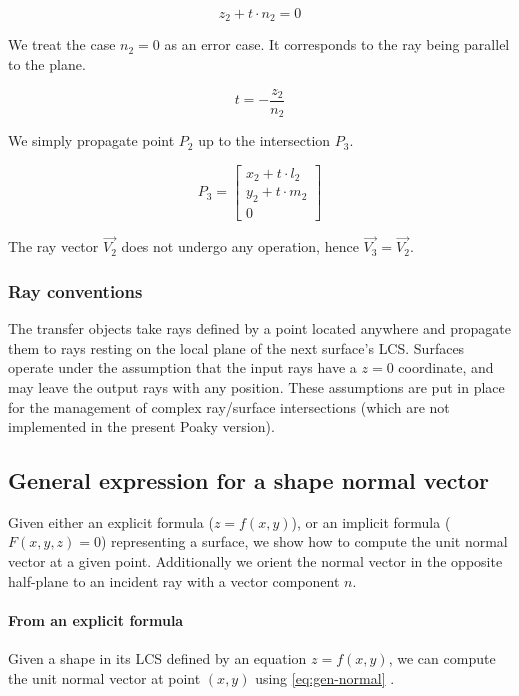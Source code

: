 \begin{equation}
z_2 + t \cdot n_2 = 0
\end{equation}

We treat the case $n_2 = 0$ as an error case. It corresponds to the ray
being parallel to the plane.

\begin{equation}
t = - \frac{z_2}{n_2}
\end{equation}

We simply propagate point $P_2$ up to the intersection $P_3$.

\begin{equation}
P_3 = \begin{bmatrix}
x_2 + t \cdot l_2 \\
y_2 + t \cdot m_2 \\
0
\end{bmatrix}
\end{equation}

The ray vector $\overrightarrow{V_2}$ does not undergo any operation, hence
$\overrightarrow{V_3} = \overrightarrow{V_2}$.

\subsubsection{Ray conventions}
The transfer objects take rays defined by a point located
anywhere and propagate them to rays resting on the local plane of the
next surface's \gls{LCS}. Surfaces operate under the assumption that
the input rays have a $z=0$ coordinate, and may leave the output rays
with any position. These assumptions are put in place for the management
of complex ray/surface intersections (which are not implemented in the
present Poaky version).

\subsection{General expression for a shape normal vector}
Given either an explicit formula ($z = f(x, y)$), or an implicit
formula ($F(x, y, z) = 0$) representing a surface, we show how
to compute the unit normal vector at a given point. Additionally
we orient the normal vector in the opposite half-plane to an incident
ray with a vector component $n$.

\paragraph{From an explicit formula}
Given a shape in its \gls{LCS} defined by an equation $z = f(x, y)$,
we can compute the unit normal vector at point $(x, y)$ using
\cref{eq:gen-normal} \cite{mathworld:normal-vector}. 

